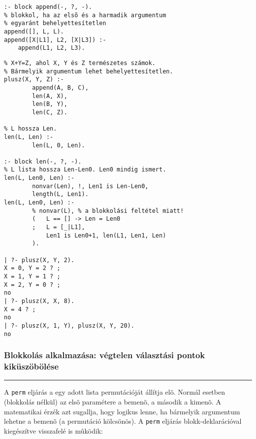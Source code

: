 \begin{verbatim}
:- block append(-, ?, -).
% blokkol, ha az elsõ és a harmadik argumentum 
% egyaránt behelyettesítetlen
append([], L, L).
append([X|L1], L2, [X|L3]) :-
    append(L1, L2, L3).
\end{verbatim}

\label{plusz3}
\begin{verbatim}
% X+Y=Z, ahol X, Y és Z természetes számok.
% Bármelyik argumentum lehet behelyettesítetlen.
plusz(X, Y, Z) :-
        append(A, B, C),
        len(A, X),
        len(B, Y),
        len(C, Z).

% L hossza Len.
len(L, Len) :-
        len(L, 0, Len).

:- block len(-, ?, -).
% L lista hossza Len-Len0. Len0 mindig ismert.
len(L, Len0, Len) :-
        nonvar(Len), !, Len1 is Len-Len0, 
        length(L, Len1).
len(L, Len0, Len) :- 
        % nonvar(L), % a blokkolási feltétel miatt!
        (   L == [] -> Len = Len0
        ;   L = [_|L1],
            Len1 is Len0+1, len(L1, Len1, Len)
        ).

| ?- plusz(X, Y, 2).
X = 0, Y = 2 ? ;
X = 1, Y = 1 ? ;
X = 2, Y = 0 ? ;
no
| ?- plusz(X, X, 8).
X = 4 ? ;
no
| ?- plusz(X, 1, Y), plusz(X, Y, 20).
no
\end{verbatim}

\subsubsection{Blokkolás alkalmazása: végtelen választási pontok kiküszöbölése}
\br

\hspace*{3mm}\rule[-5ex]{0.3mm}{11ex}\hspace*{-3mm}

\br

A {\tt perm} eljárás a egy adott lista permutációját állítja
elõ. Normál esetben (blokkolás nélkül) az elsõ paramétere a
bemenõ, a második a kimenõ. A matematikai érzék azt sugallja,
hogy logikus lenne, ha bármelyik argumentum lehetne a bemenõ (a
permutáció kölcsönös). A {\tt perm} eljárás
blokk-deklarációval kiegészítve visszafelé is mûködik:

